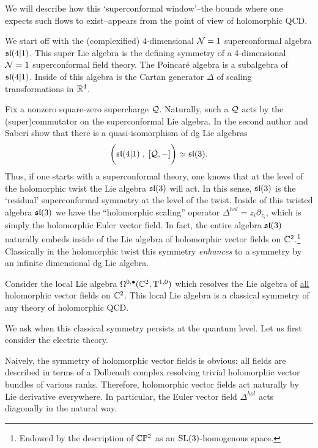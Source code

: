 \documentclass[11pt]{amsart}
\def\SU{{\rm SU}}
\begin{document}
We will describe how this `superconformal window'--the bounds where one expects such flows to exist--appears from the point of view of holomorphic QCD. 

We start off with the (complexified) 4-dimensional $\cN=1$ superconformal algebra $\sl(4|1)$.
This super Lie algebra is the defining symmetry of a 4-dimensional $\cN=1$ superconformal field theory. 
The Poincar\'{e} algebra is a subalgebra of $\sl(4|1)$. %
Inside of this algebra is the Cartan generator $\Delta$ of scaling transformations in $\RR^4$.

Fix a nonzero square-zero supercharge $\cQ$. 
Naturally, such a $\cQ$ acts by the (super)commutator on the superconformal Lie algebra.
In \cite{SWsuco} the second author and Saberi show that there is a quasi-isomorphism of dg Lie algebras
\[
\bigg(\sl(4|1) \; , \; [\cQ, -] \bigg) \simeq \sl(3) .
\]
Thus, if one starts with a superconformal theory, one knows that at the level of the holomorphic twist the Lie algebra $\sl(3)$ will act.  
In this sense, $\sl(3)$ is the `residual' superconformal symmetry at the level of the twist. 
Inside of this twisted algebra $\sl(3)$ we have the ``holomorphic scaling'' operator $\Delta^{hol} = z_i \partial_{z_i}$, which is simply the holomorphic Euler vector field.  
In fact, the entire algebra $\sl(3)$ naturally embeds inside of the Lie algebra of holomorphic vector fields on $\CC^2$.\footnote{Endowed by the description of $\CC \PP^2$ as an ${\rm SL}(3)$-homogenous space.}
Classically in the holomorphic twist this symmetry {\em enhances} to a symmetry by an infinite dimensional dg Lie algebra. 

\begin{thm} \label{thm:swsuco}
Consider the local Lie algebra $\Omega^{0,\bu}(\CC^2, \T^{1,0})$ which resolves the Lie algebra of \ul{all} holomorphic vector fields on $\CC^2$. 
This local Lie algebra is a classical symmetry of any theory of holomorphic QCD. 
\end{thm}

We ask when this classical symmetry persists at the quantum level. 
Let us first consider the electric theory. 

Naively, the symmetry of holomorphic vector fields is obvious: all fields are described in terms of a Dolbeault complex resolving trivial holomorphic vector bundles of various ranks. 
Therefore, holomorphic vector fields act naturally by Lie derivative everywhere. 
In particular, the Euler vector field $\Delta^{hol}$ acts diagonally in the natural way. 
\end{document}
